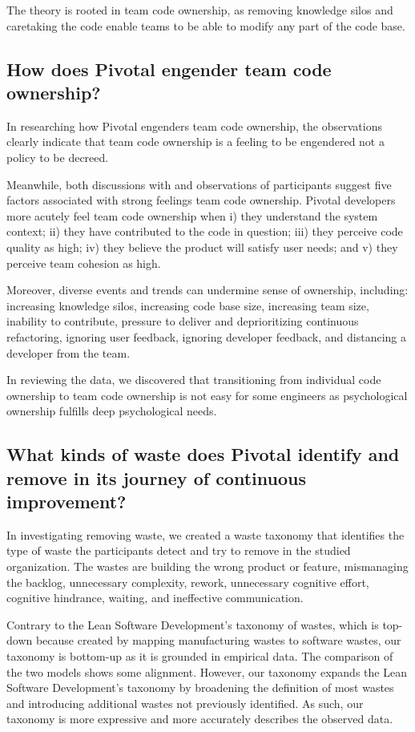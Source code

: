 The theory is rooted in team code ownership, as removing knowledge silos and caretaking the code enable teams to be able to modify any part of the code base. 


\subsection{How does Pivotal engender team code ownership?}
In researching how Pivotal engenders team code ownership, the observations clearly indicate that team code ownership is a feeling to be engendered not a policy to be decreed.


Meanwhile, both discussions with and observations of participants suggest five factors associated with strong feelings team code ownership. Pivotal developers more acutely feel team code ownership when i) they understand the system context; ii) they have contributed to the code in question; iii) they perceive code quality as high; iv) they believe the product will satisfy user needs; and v) they perceive team cohesion as high.


Moreover, diverse events and trends can undermine sense of ownership, including: increasing knowledge silos, increasing code base size, increasing team size, inability to contribute, pressure to deliver and deprioritizing continuous refactoring, ignoring user feedback, ignoring developer feedback, and distancing a developer from the team.


In reviewing the data, we discovered that transitioning from individual code ownership to team code ownership is not easy for some engineers as psychological ownership fulfills deep psychological needs.


\subsection{What kinds of waste does Pivotal identify and remove in its journey of continuous improvement? }


In investigating removing waste, we created a waste taxonomy that identifies the type of waste the participants detect and try to remove in the studied organization. The wastes are building the wrong product or feature, mismanaging the backlog, unnecessary complexity, rework, unnecessary cognitive effort, cognitive hindrance, waiting, and ineffective communication.


Contrary to the Lean Software Development's taxonomy of wastes, which is top-down because created by mapping manufacturing wastes to software wastes, our taxonomy is bottom-up as it is grounded in empirical data. The comparison of the two models shows some alignment. However, our taxonomy expands the Lean Software Development's taxonomy by broadening the definition of most wastes and introducing additional wastes not previously identified. As such, our taxonomy is more expressive and more accurately describes the observed data.


